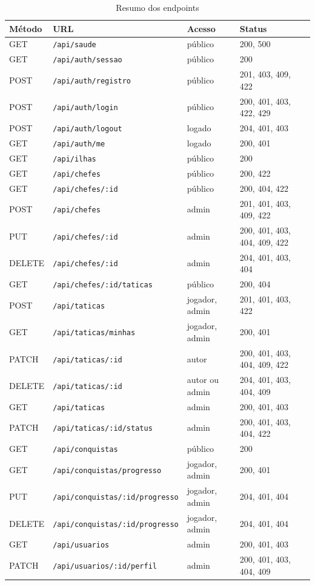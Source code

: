\documentclass[12pt,a4paper]{article}
\newcommand{\cod}[1]{\texttt{#1}}
\begin{document}
\begin{table}[H]
\centering
\footnotesize
\begin{tabular}{|l|l|l|l|}
\hline
\textbf{Método} & \textbf{URL} & \textbf{Acesso} & \textbf{Status} \\ \hline
GET & \cod{/api/saude} & público & 200, 500 \\ \hline
GET & \cod{/api/auth/sessao} & público & 200 \\ \hline
POST & \cod{/api/auth/registro} & público & 201, 403, 409, 422 \\ \hline
POST & \cod{/api/auth/login} & público & 200, 401, 403, 422, 429 \\ \hline
POST & \cod{/api/auth/logout} & logado & 204, 401, 403 \\ \hline
GET & \cod{/api/auth/me} & logado & 200, 401 \\ \hline
GET & \cod{/api/ilhas} & público & 200 \\ \hline
GET & \cod{/api/chefes} & público & 200, 422 \\ \hline
GET & \cod{/api/chefes/:id} & público & 200, 404, 422 \\ \hline
POST & \cod{/api/chefes} & admin & 201, 401, 403, 409, 422 \\ \hline
PUT & \cod{/api/chefes/:id} & admin & 200, 401, 403, 404, 409, 422 \\ \hline
DELETE & \cod{/api/chefes/:id} & admin & 204, 401, 403, 404 \\ \hline
GET & \cod{/api/chefes/:id/taticas} & público & 200, 404 \\ \hline
POST & \cod{/api/taticas} & jogador, admin & 201, 401, 403, 422 \\ \hline
GET & \cod{/api/taticas/minhas} & jogador, admin & 200, 401 \\ \hline
PATCH & \cod{/api/taticas/:id} & autor & 200, 401, 403, 404, 409, 422 \\ \hline
DELETE & \cod{/api/taticas/:id} & autor ou admin & 204, 401, 403, 404, 409 \\ \hline
GET & \cod{/api/taticas} & admin & 200, 401, 403 \\ \hline
PATCH & \cod{/api/taticas/:id/status} & admin & 200, 401, 403, 404, 422 \\ \hline
GET & \cod{/api/conquistas} & público & 200 \\ \hline
GET & \cod{/api/conquistas/progresso} & jogador, admin & 200, 401 \\ \hline
PUT & \cod{/api/conquistas/:id/progresso} & jogador, admin & 204, 401, 404 \\ \hline
DELETE & \cod{/api/conquistas/:id/progresso} & jogador, admin & 204, 401, 404 \\ \hline
GET & \cod{/api/usuarios} & admin & 200, 401, 403 \\ \hline
PATCH & \cod{/api/usuarios/:id/perfil} & admin & 200, 401, 403, 404, 409 \\ \hline
\end{tabular}
\caption{Resumo dos endpoints}
\end{table}
\end{document}
